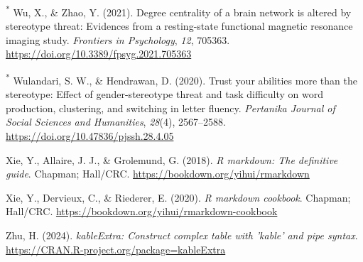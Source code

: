 \documentclass[
  stu, a4paper,floatsintext]{apa7}
\newlength{\cslhangindent}
\newenvironment{CSLReferences}[2] %
 {\begin{list}{}{%
  \setlength{\itemindent}{0pt}
  \setlength{\leftmargin}{0pt}
  \setlength{\parsep}{0pt}
  \ifodd #1
   \setlength{\leftmargin}{\cslhangindent}
   \setlength{\itemindent}{-1\cslhangindent}
  \fi
  \setlength{\itemsep}{#2\baselineskip}}}
 {\end{list}}
\begin{document}
\begin{CSLReferences}{1}{0}
\textsuperscript{*} Wu, X., \& Zhao, Y. (2021). Degree centrality of a brain network is altered by stereotype threat: {Evidences} from a resting-state functional magnetic resonance imaging study. \emph{Frontiers in Psychology}, \emph{12}, 705363. \url{https://doi.org/10.3389/fpsyg.2021.705363}

\textsuperscript{*} Wulandari, S. W., \& Hendrawan, D. (2020). Trust your abilities more than the stereotype: {Effect} of gender-stereotype threat and task difficulty on word production, clustering, and switching in letter fluency. \emph{Pertanika Journal of Social Sciences and Humanities}, \emph{28}(4), 2567--2588. \url{https://doi.org/10.47836/pjssh.28.4.05}

Xie, Y., Allaire, J. J., \& Grolemund, G. (2018). \emph{R markdown: The definitive guide}. Chapman; Hall/CRC. \url{https://bookdown.org/yihui/rmarkdown}

Xie, Y., Dervieux, C., \& Riederer, E. (2020). \emph{R markdown cookbook}. Chapman; Hall/CRC. \url{https://bookdown.org/yihui/rmarkdown-cookbook}

Zhu, H. (2024). \emph{kableExtra: Construct complex table with 'kable' and pipe syntax}. \url{https://CRAN.R-project.org/package=kableExtra}

\end{CSLReferences}


\clearpage
\renewcommand{\listfigurename}{Figure captions}

\clearpage
\renewcommand{\listtablename}{Table captions}
\end{document}
